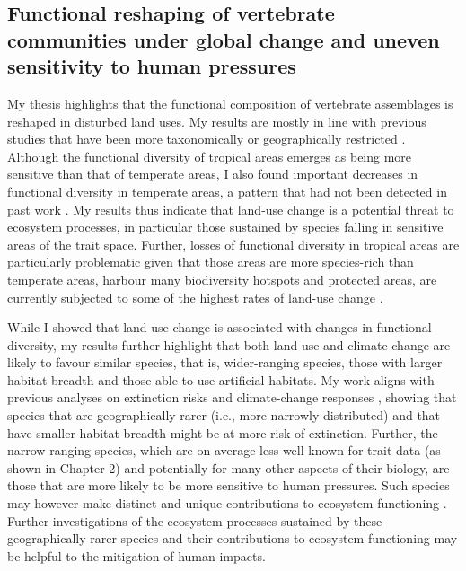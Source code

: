 \subsection{Functional reshaping of vertebrate communities under global change and uneven sensitivity to human pressures}
My thesis highlights that the functional composition of vertebrate assemblages is reshaped in disturbed land uses. My results are mostly in line with previous studies that have been more taxonomically or geographically restricted \citep{Flynn2009, Matuoka2020, Marcacci2021}. Although the functional diversity of tropical areas emerges as being more sensitive than that of temperate areas, I also found important decreases in functional diversity in temperate areas, a pattern that had not been detected in past work \citep{Matuoka2020}. My results thus indicate that land-use change is a potential threat to ecosystem processes, in particular those sustained by species falling in sensitive areas of the trait space. Further, losses of functional diversity in tropical areas are particularly problematic given that those areas are more species-rich than temperate areas, harbour many biodiversity hotspots and protected areas, are currently subjected to some of the highest rates of land-use change \citep{Laurance2012, Hansen2013, Spracklen2015}. 

While I showed that land-use change is associated with changes in functional diversity, my results further highlight that both land-use and climate change are likely to favour similar species, that is, wider-ranging species, those with larger habitat breadth and those able to use artificial habitats. My work aligns with previous analyses on extinction risks \citep{Chichorro2019} and climate-change responses \citep{MacLean2017}, showing that species that are geographically rarer (i.e., more narrowly distributed) and that have smaller habitat breadth might be at more risk of extinction. Further, the narrow-ranging species, which are on average less well known for trait data (as shown in Chapter 2) and potentially for many other aspects of their biology, are those that are more likely to be more sensitive to human pressures. Such species may however make distinct and unique contributions to ecosystem functioning \citep{Mouillot2013,Dee2019}. Further investigations of the ecosystem processes sustained by these geographically rarer species and their contributions to ecosystem functioning may be helpful to the mitigation of human impacts. 


